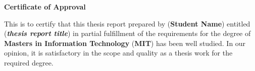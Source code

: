 \documentclass[a4paper,12pt]{report}
\begin{document}
\newpage
\thispagestyle{empty}     %
\begin{center}
    \onehalfspacing
    \large
    \textbf{Certificate of Approval} \\
    \vspace{1cm}
\end{center}

\noindent
This is to certify that this thesis report prepared by (\textbf{Student Name}) entitled (\textbf{\textit{thesis report title}}) in partial fulfillment of the requirements for the degree of \textbf{Masters in Information Technology} (\textbf{MIT}) has been well studied. In our opinion, it is satisfactory in the scope and quality as a thesis work for the required degree.

\vspace{2cm}
\end{document}
